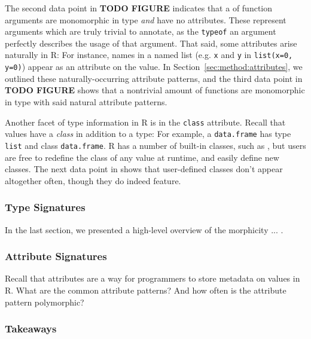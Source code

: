 \documentclass[acmsmall,10pt,review,anonymous]{acmart}\settopmatter{printfolios=true,printccs=false,printacmref=false}
\begin{document}
The second data point in \textbf{TODO FIGURE} indicates that a
 of function arguments are monomorphic in type \textit{and}
have no attributes.  These represent arguments which are truly trivial to
annotate, as the {\tt typeof} an argument perfectly describes the usage of
that argument.  That said, some attributes arise naturally in R: For
instance, names in a named list (e.g. {\tt x} and {\tt y} in {\tt list(x=0,
  y=0)}) appear as an attribute on the value.  In
Section~\ref{sec:method:attributes}, we outlined these naturally-occurring
attribute patterns, and the third data point in \textbf{TODO FIGURE} shows
that a nontrivial amount of functions are monomorphic in type with said
natural attribute patterns.

Another facet of type information in R is in the {\tt class} attribute.
Recall that values have a \textit{class} in addition to a type: For example,
a {\tt data.frame} has type {\tt list} and class {\tt data.frame}.
 R has a number of built-in classes, such as
, but users are free to redefine the class of any value at
runtime, and easily define new classes.  The next data point in
 shows that user-defined classes don't appear altogether often,
though they do indeed feature.  


\subsubsection{Type Signatures}

In the last section, we presented a high-level overview of the morphicity ... .

\subsubsection{Attribute Signatures}

Recall that attributes are a way for programmers to store metadata on values in R.
What are the common attribute patterns?
And how often is the attribute pattern polymorphic?

\subsubsection{Takeaways}
\end{document}
